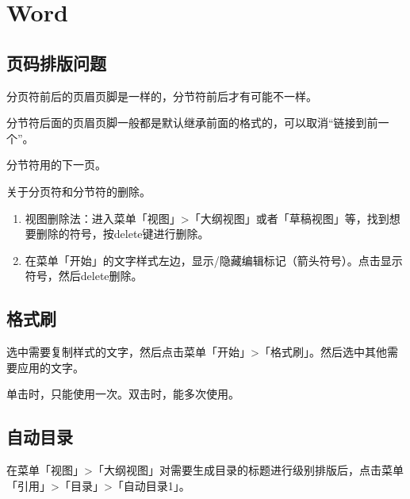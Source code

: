 \section{Word}

\subsection{页码排版问题}
分页符前后的页眉页脚是一样的，分节符前后才有可能不一样。

分节符后面的页眉页脚一般都是默认继承前面的格式的，可以取消“链接到前一个”。

分节符用的下一页。

关于分页符和分节符的删除。
\begin{enumerate}
    \item 视图删除法：进入菜单「视图」>「大纲视图」或者「草稿视图」等，找到想要删除的符号，按delete键进行删除。
    \item 在菜单「开始」的文字样式左边，显示/隐藏编辑标记（箭头符号）。点击显示符号，然后delete删除。
\end{enumerate}

\subsection{格式刷}
选中需要复制样式的文字，然后点击菜单「开始」>「格式刷」。然后选中其他需要应用的文字。

单击时，只能使用一次。双击时，能多次使用。

\subsection{自动目录}
在菜单「视图」>「大纲视图」对需要生成目录的标题进行级别排版后，点击菜单「引用」>「目录」>「自动目录1」。
